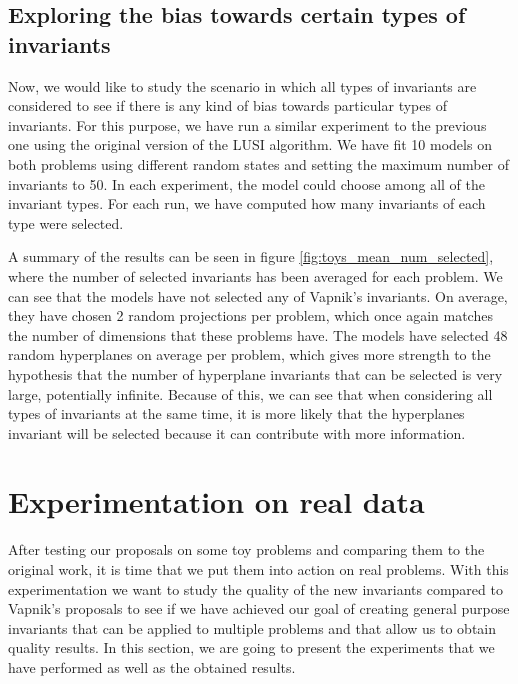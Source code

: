 \subsection{Exploring the bias towards certain types of invariants}

Now, we would like to study the scenario in which all types of invariants are considered to see if there is
any kind of bias towards particular types of invariants. For this purpose, we have run a similar experiment to
the previous one using the original version of the LUSI algorithm. We have fit 10 models on both problems
using different random states and setting the maximum number of invariants to 50. In each experiment, the
model could choose among all of the invariant types. For each run, we have computed how many invariants of
each type were selected.

A summary of the results can be seen in figure \ref{fig:toys_mean_num_selected}, where the number of
selected invariants has been averaged for each problem. We can see that the models have not selected any of
Vapnik's invariants. On average, they have chosen 2 random projections per problem, which once again matches
the number of dimensions that these problems have. The models have selected 48 random hyperplanes on average
per problem, which gives more strength to the hypothesis that the number of hyperplane invariants that
can be selected is very large, potentially infinite. Because of this, we can see that when considering
all types of invariants at the same time, it is more likely that the hyperplanes invariant will be selected
because it can contribute with more information.

\section{Experimentation on real data}

After testing our proposals on some toy problems and comparing them to the original work, it is time that we
put them into action on real problems. With this experimentation we want to study the quality of the
new invariants compared to Vapnik's proposals to see if we have achieved our goal of creating general purpose
invariants that can be applied to multiple problems and that allow us to obtain quality results. In this section,
we are going to present the experiments that we have performed as well as the obtained results.

